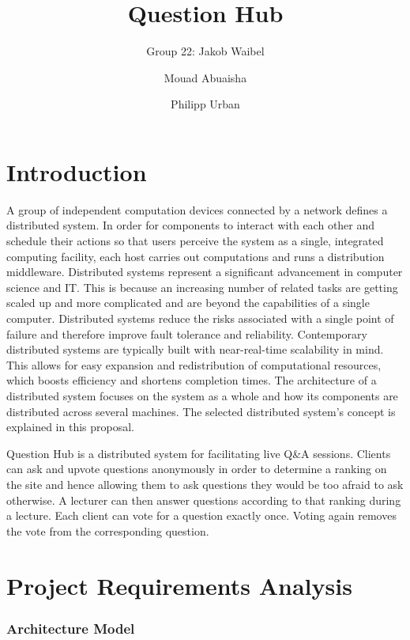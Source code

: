 \documentclass[runningheads]{llncs}
\begin{document}
\title{Question Hub}

\author{Group 22: Jakob Waibel \and Mouad Abuaisha \and Philipp Urban}

\institute{}
\maketitle              

\section{Introduction}

A group of independent computation devices connected by a network defines a
distributed system. In order for components to interact with each other and
schedule their actions so that users perceive the system as a single,
integrated computing facility, each host carries out computations and runs a
distribution middleware\cite{coulouris2005distributed}. Distributed systems
represent a significant advancement in computer science and IT. This is because
an increasing number of related tasks are getting scaled up and more
complicated and are beyond the capabilities of a single computer. Distributed
systems reduce the risks associated with a single point of failure and
therefore improve fault tolerance and reliability. Contemporary distributed
systems are typically built with near-real-time scalability in mind. This
allows for easy expansion and redistribution of computational resources, which
boosts efficiency and shortens completion times. The architecture of a 
distributed system focuses on the system as a whole and how its components are
distributed across several machines\cite{tanenbaum2007distributed}.
The selected distributed system's concept is explained in this proposal.

Question Hub is a distributed system for facilitating live Q\&A sessions.
Clients can ask and upvote questions anonymously in order to determine a
ranking on the site and hence allowing them to ask questions they would be too
afraid to ask otherwise. A lecturer can then answer questions according to that
ranking during a lecture. Each client can vote for a question exactly once.
Voting again removes the vote from the corresponding question.

\section{Project Requirements Analysis}

\subsubsection{Architecture Model}
\end{document}
